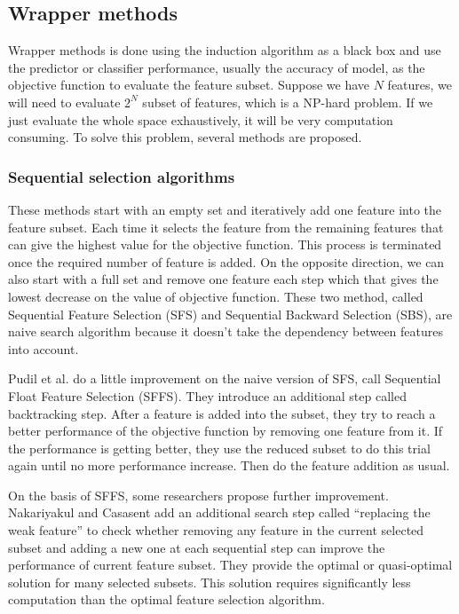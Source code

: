 \subsection{Wrapper methods}
Wrapper methods is done using the induction algorithm as a black box and use the predictor or classifier performance, usually the accuracy of model, as the objective function to evaluate the feature subset\cite{kohavi1997wrappers}. Suppose we have $N$ features, we will need to evaluate $2^N$ subset of features, which is a NP-hard problem. If we just evaluate the whole space exhaustively, it will be very computation consuming. To solve this problem, several methods are proposed.
\subsubsection{Sequential selection algorithms}
These methods start with an empty set and iteratively add one feature into the feature subset. Each time it selects the feature from the remaining features that can give the highest value for the objective function. This process is terminated once the required number of feature is added. On the opposite direction, we can also start with a full set and remove one feature each step which that gives the lowest decrease on the value of objective function. These two method, called Sequential Feature Selection (SFS) and Sequential Backward Selection (SBS), are naive search algorithm because it doesn't take the dependency between features into account. 

Pudil et al. do a little improvement on the naive version of SFS, call Sequential Float Feature Selection (SFFS). They introduce an additional step called backtracking step. After a feature is added into the subset, they try to reach a better performance of the objective function by removing one feature from it\cite{pudil1994floating}. If the performance is getting better, they use the reduced subset to do this trial again until no more performance increase. Then do the feature addition as usual.

On the basis of SFFS, some researchers propose further improvement. Nakariyakul and Casasent add an additional search step called ``replacing the weak feature'' to check whether removing any feature in the current selected subset and adding a new one at each sequential step can improve the performance of current feature subset\cite{nakariyakul2009improvement}. They provide the optimal or quasi-optimal solution for many selected subsets. This solution requires significantly less computation than the optimal feature selection algorithm.

